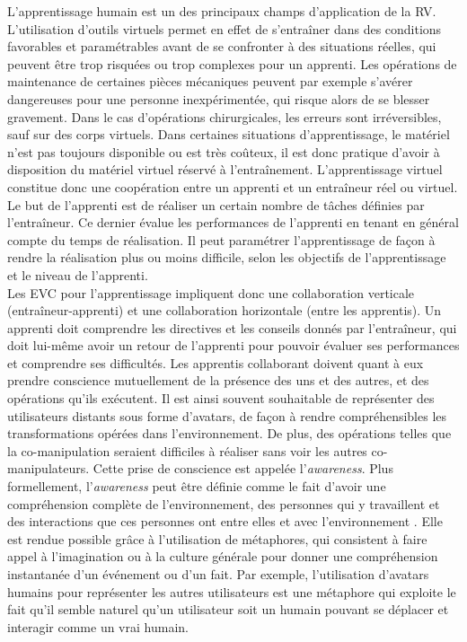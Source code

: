 \documentclass[11pt]{article}
\begin{document}
L'apprentissage humain est un des principaux champs d'application de la RV. L'utilisation d'outils virtuels permet en effet de s'entraîner dans des conditions favorables et paramétrables avant de se confronter à des situations réelles, qui peuvent être trop risquées ou trop complexes pour un apprenti. Les opérations de maintenance de certaines pièces mécaniques peuvent par exemple s'avérer dangereuses pour une personne inexpérimentée, qui risque alors de se blesser gravement. Dans le cas d'opérations chirurgicales, les erreurs sont irréversibles, sauf sur des corps virtuels. Dans certaines situations d'apprentissage, le matériel n'est pas toujours disponible ou est très coûteux, il est donc pratique d'avoir à disposition du matériel virtuel réservé à l'entraînement. L'apprentissage virtuel constitue donc une coopération entre un apprenti et un entraîneur réel ou virtuel. Le but de l'apprenti est de réaliser un certain nombre de tâches définies par l'entraîneur. Ce dernier évalue les performances de l'apprenti en tenant en général compte du temps de réalisation. Il peut paramétrer l'apprentissage de façon à rendre la réalisation plus ou moins difficile, selon les objectifs de l'apprentissage et le niveau de l'apprenti.
\\

Les EVC pour l'apprentissage impliquent donc une collaboration verticale (entraîneur-apprenti) et une collaboration horizontale (entre les apprentis). Un apprenti doit comprendre les directives et les conseils donnés par l'entraîneur, qui doit lui-même avoir un retour de l'apprenti pour pouvoir évaluer ses performances et comprendre ses difficultés. Les apprentis collaborant doivent quant à eux prendre conscience mutuellement de la présence des uns et des autres, et des opérations qu'ils exécutent. Il est ainsi souvent souhaitable de représenter des utilisateurs distants sous forme d'avatars, de façon à rendre compréhensibles les transformations opérées dans l'environnement. De plus, des opérations telles que la co-manipulation seraient difficiles à réaliser sans voir les autres co-manipulateurs. Cette prise de conscience est appelée l'\textit{awareness}. Plus formellement, l'\textit{awareness} peut être définie comme le fait d'avoir une compréhension complète de l'environnement, des personnes qui y travaillent et des interactions que ces personnes ont entre elles et avec l'environnement \cite{survey}. Elle est rendue possible grâce à l'utilisation de métaphores, qui consistent à faire appel à l'imagination ou à la culture générale pour donner une compréhension instantanée d'un événement ou d'un fait. Par exemple, l'utilisation d'avatars humains pour représenter les autres utilisateurs est une métaphore qui exploite le fait qu'il semble naturel qu'un utilisateur soit un humain pouvant se déplacer et interagir comme un vrai humain.
\\
\end{document}
